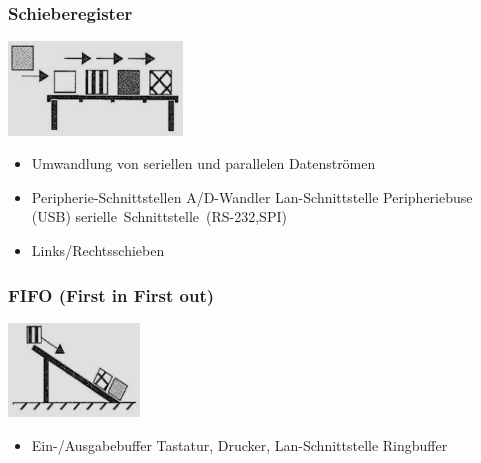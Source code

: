 \begin{multicols}{3}
\begin{minipage}{\linewidth}
    \subsubsection{Schieberegister}
        \includegraphics[height=2.5cm]{images/SystembusSpeicherSpeichersystem/SpeicherSysSchiebReg}
    \begin{itemize}
        \item Umwandlung von seriellen und parallelen Datenströmen
        \item Peripherie-Schnittstellen
        \subitem A/D-Wandler
        \subitem Lan-Schnittstelle
        \subitem Peripheriebuse (USB)
        \subitem \mbox{serielle Schnittstelle (RS-232,SPI)}
        \item Links/Rechtsschieben
    \end{itemize}
\end{minipage}

\begin{minipage}{\linewidth}
    \subsubsection{FIFO (First in First out)}
    \includegraphics[height=2.5cm]{images/SystembusSpeicherSpeichersystem/SpeicherSysFIFO}
    \begin{itemize}
        \item Ein-/Ausgabebuffer
        \subitem Tastatur, Drucker, Lan-Schnittstelle
        \subitem Ringbuffer
    \end{itemize}
\end{minipage}

\begin{minipage}{\linewidth}

\end{minipage}
\end{multicols}
